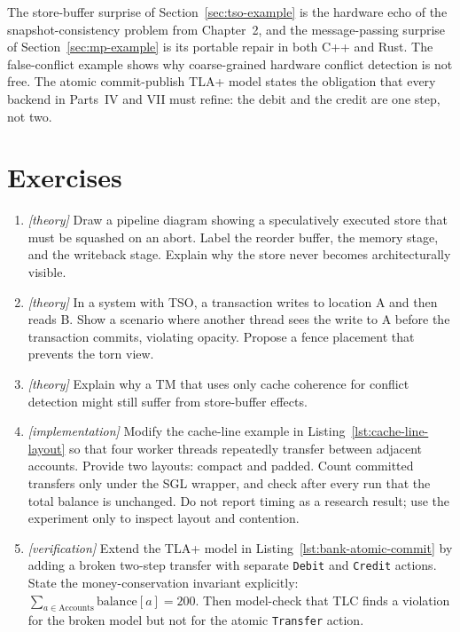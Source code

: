 The store-buffer surprise of Section~\ref{sec:tso-example} is the hardware
echo of the snapshot-consistency problem from Chapter~2, and the
message-passing surprise of Section~\ref{sec:mp-example} is its portable
repair in both C++ and Rust. The false-conflict example shows why
coarse-grained hardware conflict detection is not free. The atomic
commit-publish TLA+ model states the obligation that every backend in
Parts~IV and VII must refine: the debit and the credit are one step, not two.

\section{Exercises}

\begin{enumerate}
\item \emph{[theory]} Draw a pipeline diagram showing a speculatively
executed store that must be squashed on an abort. Label the reorder
buffer, the memory stage, and the writeback stage. Explain why the
store never becomes architecturally visible.

\item \emph{[theory]} In a system with TSO, a transaction writes to
location A and then reads B. Show a scenario where another thread sees
the write to A before the transaction commits, violating opacity.
Propose a fence placement that prevents the torn view.

\item \emph{[theory]} Explain why a TM that uses only cache coherence for
conflict detection might still suffer from store-buffer effects.

\item \emph{[implementation]} Modify the cache-line example in
Listing~\ref{lst:cache-line-layout} so that four worker threads
repeatedly transfer between adjacent accounts. Provide two layouts:
compact and padded. Count committed transfers only under the SGL
wrapper, and check after every run that the total balance is
unchanged. Do not report timing as a research result; use the
experiment only to inspect layout and contention.

\item \emph{[verification]} Extend the TLA+ model in
Listing~\ref{lst:bank-atomic-commit} by adding a broken two-step
transfer with separate \texttt{Debit} and \texttt{Credit} actions.
State the money-conservation invariant explicitly:
$\sum_{a \in \mathrm{Accounts}} \mathrm{balance}[a] = 200$.
Then model-check that TLC finds a violation for the broken model but
not for the atomic \texttt{Transfer} action.


\end{enumerate}
